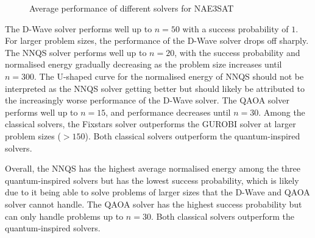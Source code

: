 \begin{figure}[!htb]
    \centering
    \hspace{30pt}
    \caption{Average performance of different solvers for NAE3SAT}
    \label{all-nae3sat-average}
\end{figure}

The D-Wave solver performs well up to $n=50$ with a success probability of $1$. For larger problem sizes, the performance of the D-Wave solver drops off sharply. The NNQS solver performs well up to $n=20$, with the success probability and normalised energy gradually decreasing as the problem size increases until $n=300$. The U-shaped curve for the normalised energy of NNQS should not be interpreted as the NNQS solver getting better but should likely be attributed to the increasingly worse performance of the D-Wave solver. The QAOA solver performs well up to $n=15$, and performance decreases until $n=30$. Among the classical solvers, the Fixstars solver outperforms the GUROBI solver at larger problem sizes ($>150$). Both classical solvers outperform the quantum-inspired solvers.

Overall, the NNQS has the highest average normalised energy among the three quantum-inspired solvers but has the lowest success probability, which is likely due to it being able to solve problems of larger sizes that the D-Wave and QAOA solver cannot handle. The QAOA solver has the highest success probability but can only handle problems up to $n=30$. Both classical solvers outperform the quantum-inspired solvers.


